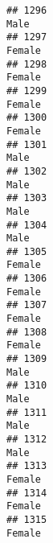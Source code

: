 \documentclass[]{article}
\begin{document}
\begin{verbatim}
## 1296                                                                                                                            Male
## 1297                                                                                                                          Female
## 1298                                                                                                                          Female
## 1299                                                                                                                          Female
## 1300                                                                                                                          Female
## 1301                                                                                                                            Male
## 1302                                                                                                                            Male
## 1303                                                                                                                            Male
## 1304                                                                                                                            Male
## 1305                                                                                                                          Female
## 1306                                                                                                                          Female
## 1307                                                                                                                          Female
## 1308                                                                                                                          Female
## 1309                                                                                                                            Male
## 1310                                                                                                                            Male
## 1311                                                                                                                            Male
## 1312                                                                                                                            Male
## 1313                                                                                                                          Female
## 1314                                                                                                                          Female
## 1315                                                                                                                          Female

\end{verbatim}
\end{document}

